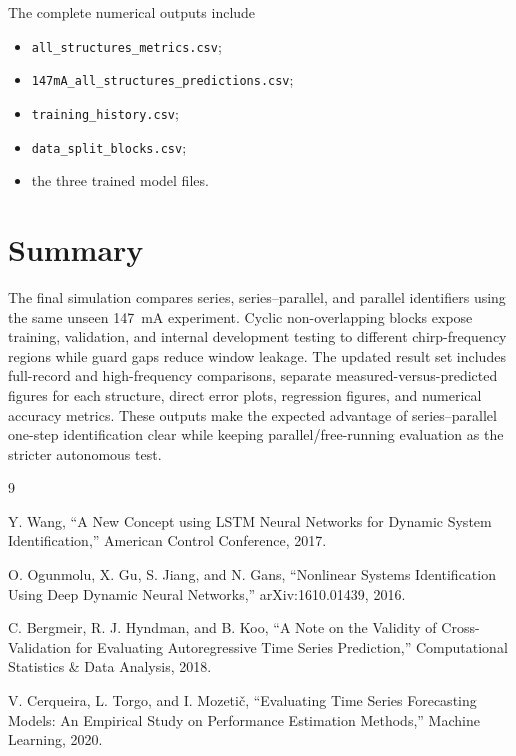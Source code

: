 \documentclass[11pt]{article}
\begin{document}
The complete numerical outputs include

\begin{itemize}[nosep]
\item \texttt{all\_structures\_metrics.csv};
\item \texttt{147mA\_all\_structures\_predictions.csv};
\item \texttt{training\_history.csv};
\item \texttt{data\_split\_blocks.csv};
\item the three trained model files.
\end{itemize}

\section{Summary}

The final simulation compares series, series--parallel, and parallel
identifiers using the same unseen 147~mA experiment. Cyclic non-overlapping blocks expose training, validation, and internal development testing to different chirp-frequency regions while guard gaps reduce window leakage.
The updated result set includes full-record and high-frequency comparisons,
separate measured-versus-predicted figures for each structure, direct error
plots, regression figures, and numerical accuracy metrics. These outputs make
the expected advantage of series--parallel one-step identification clear while
keeping parallel/free-running evaluation as the stricter autonomous test.

\begin{thebibliography}{9}

Y. Wang,
``A New Concept using LSTM Neural Networks for Dynamic System Identification,''
American Control Conference, 2017.

O. Ogunmolu, X. Gu, S. Jiang, and N. Gans,
``Nonlinear Systems Identification Using Deep Dynamic Neural Networks,''
arXiv:1610.01439, 2016.

C. Bergmeir, R. J. Hyndman, and B. Koo,
``A Note on the Validity of Cross-Validation for Evaluating Autoregressive Time Series Prediction,''
Computational Statistics \& Data Analysis, 2018.

V. Cerqueira, L. Torgo, and I. Mozeti\v{c},
``Evaluating Time Series Forecasting Models: An Empirical Study on Performance Estimation Methods,''
Machine Learning, 2020.

\end{thebibliography}
\end{document}
